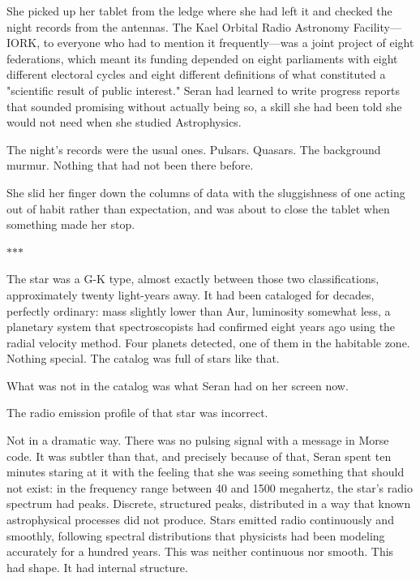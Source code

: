 \documentclass[11pt,a5paper,twoside]{book}
\begin{document}
She picked up her tablet from the ledge where she had left it and checked the night records from the antennas. The Kael Orbital Radio Astronomy Facility—IORK, to everyone who had to mention it frequently—was a joint project of eight federations, which meant its funding depended on eight parliaments with eight different electoral cycles and eight different definitions of what constituted a "scientific result of public interest." Seran had learned to write progress reports that sounded promising without actually being so, a skill she had been told she would not need when she studied Astrophysics.

The night's records were the usual ones. Pulsars. Quasars. The background murmur. Nothing that had not been there before.

She slid her finger down the columns of data with the sluggishness of one acting out of habit rather than expectation, and was about to close the tablet when something made her stop.

\vspace{1.5em}
\begin{center}$\ast$\quad$\ast$\quad$\ast$\end{center}
\vspace{1.5em}

The star was a G-K type, almost exactly between those two classifications, approximately twenty light-years away. It had been cataloged for decades, perfectly ordinary: mass slightly lower than Aur, luminosity somewhat less, a planetary system that spectroscopists had confirmed eight years ago using the radial velocity method. Four planets detected, one of them in the habitable zone. Nothing special. The catalog was full of stars like that.

What was not in the catalog was what Seran had on her screen now.

The radio emission profile of that star was incorrect.

Not in a dramatic way. There was no pulsing signal with a message in Morse code. It was subtler than that, and precisely because of that, Seran spent ten minutes staring at it with the feeling that she was seeing something that should not exist: in the frequency range between 40 and 1500 megahertz, the star’s radio spectrum had peaks. Discrete, structured peaks, distributed in a way that known astrophysical processes did not produce. Stars emitted radio continuously and smoothly, following spectral distributions that physicists had been modeling accurately for a hundred years. This was neither continuous nor smooth. This had shape. It had internal structure.
\end{document}
